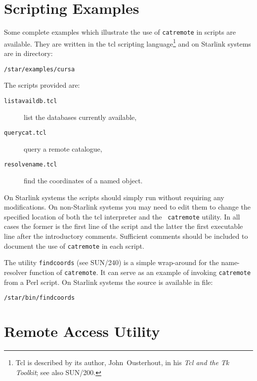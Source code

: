 \documentclass[twoside,11pt]{article}
\newcommand{\xref}[3]{#1}
\newcommand{\xlabel}[1]{}
\renewcommand{\_}{\texttt{\symbol{95}}}
\begin{document}
\section{\xlabel{S_EXAMPLES}\label{S_EXAMPLES}Scripting Examples}

Some complete examples which illustrate the use of {\tt catremote} in
scripts are available.  They are written in the tcl scripting
language\footnote{Tcl is described by its author, John~Ousterhout, in his
{\it Tcl and the Tk Toolkit}\/\cite{OUSTERHOUT94}; see also
\xref{SUN/200}{sun200}{}\cite{SUN200}.} and on Starlink systems are in
directory:

\begin{center}
{\tt /star/examples/cursa}
\end{center}

The scripts provided are:

\begin{description}

  \item[{\tt listavaildb.tcl}] list the databases currently available,

  \item[{\tt querycat.tcl}] query a remote catalogue,

  \item[{\tt resolvename.tcl}] find the coordinates of a named object.

\end{description}

On Starlink systems the scripts should simply run without requiring any
modifications.  On non-Starlink systems you may need to edit them to
change the specified location of both the tcl interpreter and the {\tt
catremote} utility.  In all cases the former is the first line of the
script and the latter the first executable line after the introductory
comments.  Sufficient comments should be included to document the use of
{\tt catremote} in each script.

The utility {\tt findcoords} (see \xref{SUN/240}{sun240}{}\cite{SUN240})
is a simple wrap-around for the name-resolver function of {\tt catremote}.
It can serve as an example of invoking {\tt catremote} from a Perl script.
On Starlink systems the source is available in file:

\begin{center}
{\tt /star/bin/findcoords}
\end{center}


\section{\xlabel{WEBPROG}\label{WEBPROG}Remote Access Utility}
\end{document}
